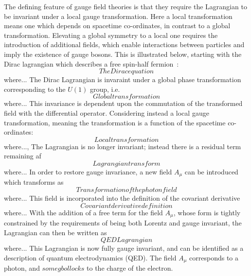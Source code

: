 The defining feature of gauge field theories is that they require the Lagrangian 
to be invariant under a local gauge transformation.
Here a local transformation means one which depends on spacetime co-ordinates, 
in contrast to a global transformation.
Elevating a global symmetry to a local one requires the introduction of additional fields, 
which enable interactions between particles and imply the existence of gauge bosons.
This is illustrated below, starting with the Dirac lagrangian 
which describes a free spin-half fermion~\cite{Dirac,Griffiths}:
\begin{equation}
The Dirac equation
\end{equation}
where... 
The Dirac Lagrangian is invaraint under a global phase transformation 
corresponding to the $U(1)$ group, i.e. 
\begin{equation}
Global transformation
\end{equation}
where...
This invariance is dependent upon the commutation of the transformed field 
with the differential operator. 
Considering instead a local gauge transformation, 
meaning the transformation is a function of the spacetime co-ordinates:
\begin{equation}
Local transformation
\end{equation}
where...,
The Lagrangian is no longer invariant;
instead there is a residual term remaining af
\begin{equation}
Lagrangian transform
\end{equation}
where... 
In order to restore gauge invariance, a new field $A_{\mu}$ can be introduced 
which transforms as
\begin{equation}
Transformation of the photon field
\end{equation}
where... %
This field is incorporated into the definition of the covariant derivative
\begin{equation}
Covariant derivative definition
\end{equation}
where... 
With the addition of a free term for the field $A_{\mu}$, 
whose form is tightly constrained by the requirements of being both Lorentz and gauge invariant, 
the Lagrangian can then be written as
\begin{equation}
QED Lagrangian
\end{equation}
where... 
This Lagrangian is now fully gauge invariant, 
and can be identified as a description of quantum electrodynamics (QED).
The field $A_{\mu}$ corresponds to a photon, and $some g bollocks$ to the charge of the electron.

